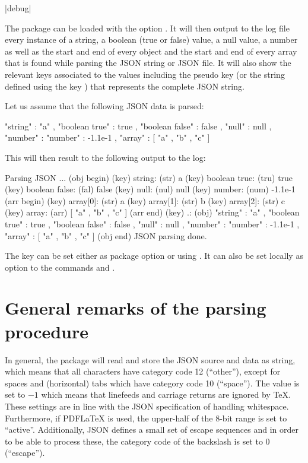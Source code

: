 \documentclass[a4paper]{article}
\begin{document}
\begin{macrodef}
|debug|
\end{macrodef}
The package can be loaded with the option . It will then output to the log file every instance of a string, a boolean (true or false) value, a null value, a number as well as the start and end of every object and the start and end of every array that is found while parsing the JSON string or JSON file. It will also show the relevant keys associated to the values including the pseudo key  (or the string defined using the key ) that represents the complete JSON string.

Let us assume that the following JSON data is parsed:

\begin{codeexample}
  {
    "string" : "a" ,
    "boolean true" : true , 
    "boolean false" : false ,
    "null" : null ,
    "number" : "number" : -1.1e-1 ,
    "array" : [ "a" , "b" , "c" ]
  }
\end{codeexample}

This will then result to the following output to the log:

\begin{codeexample}
  Parsing JSON ...
  (obj begin)
  (key) string:
    (str) a
  (key) boolean true:
    (tru) true
  (key) boolean false:
    (fal) false
  (key) null:
    (nul) null
  (key) number:
    (num) -1.1e-1
  (arr begin)
  (key) array[0]:
    (str) a
  (key) array[1]:
    (str) b
  (key) array[2]:
    (str) c
  (key) array:
    (arr) [ "a" , "b" , "c" ]
  (arr end)
  (key) .:
    (obj) { "string" : "a" , "boolean true" : true , "boolean false" : 
    false , "null" : null , "number" : "number" : -1.1e-1 , "array" : 
    [ "a" , "b" , "c" ] }
  (obj end)
  JSON parsing done.
\end{codeexample}

The  key can be set either as package option or using \macro{\JSONParseSet}. It can also be set locally as option to the commands \macro{\JSONParse} and \macro{\JSONParseFromFile}.

\section{General remarks of the parsing procedure}

In general, the package will read and store the JSON source and data as string, which means that all characters have category code 12 (``other''), except for spaces and (horizontal) tabs which have category code 10 (``space''). The \macro{\endlinechar} value is set to $-1$ which means that linefeeds and carriage returns are ignored by TeX. These settings are in line with the JSON specification of handling whitespace. Furthermore, if PDFLaTeX is used, the upper-half of the 8-bit range is set to ``active''. Additionally, JSON defines a small set of escape sequences and in order to be able to process these, the category code of the backslash is set to 0 (``escape'').
\end{document}
